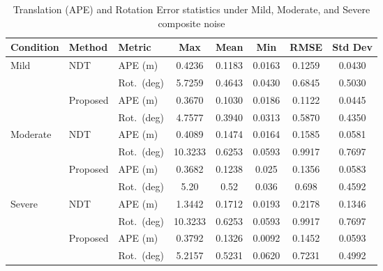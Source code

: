 \begin{table}[H]
	\centering
	\caption{Translation (APE) and Rotation Error statistics under Mild, Moderate, and Severe composite noise}
	\label{tab:ape_noise_all_swapped}
	\begin{tabular}{l l l c c c c c}
		\toprule
		\textbf{Condition} & \textbf{Method} & \textbf{Metric}  & \textbf{Max} & \textbf{Mean} & \textbf{Min} & \textbf{RMSE} & \textbf{Std Dev} \\
		\midrule
		\multirow{4}{*}{Mild}     
		& \multirow{2}{*}{NDT}      
		& APE (m)      & 0.4236 & 0.1183 & 0.0163 & 0.1259 & 0.0430 \\
		&                           
		& Rot.\ (deg)  & 5.7259 & 0.4643 & 0.0430 & 0.6845 & 0.5030 \\
		\cmidrule{2-8}
		& \multirow{2}{*}{Proposed} 
		& APE (m)      & 0.3670 & 0.1030 & 0.0186 & 0.1122 & 0.0445 \\
		&                           
		& Rot.\ (deg)  & 4.7577 & 0.3940 & 0.0313 & 0.5870 & 0.4350 \\
		\midrule
		\multirow{4}{*}{Moderate} 
		& \multirow{2}{*}{NDT}      
		& APE (m)      & 0.4089 & 0.1474 & 0.0164 & 0.1585 & 0.0581 \\
		&                           
		& Rot.\ (deg)  & 10.3233 & 0.6253 & 0.0593 & 0.9917 & 0.7697 \\
		\cmidrule{2-8}
		& \multirow{2}{*}{Proposed} 
		& APE (m)      & 0.3682 & 0.1238 & 0.025 & 0.1356 & 0.0583 \\
		&                           
		& Rot.\ (deg)  & 5.20& 0.52 & 0.036 & 0.698 & 0.4592 \\
		\midrule
		\multirow{4}{*}{Severe}   
		& \multirow{2}{*}{NDT}      
		& APE (m)      & 1.3442 & 0.1712 & 0.0193 & 0.2178 & 0.1346 \\
		&                           
		& Rot.\ (deg)  & 10.3233 & 0.6253 & 0.0593 & 0.9917 & 0.7697 \\
		\cmidrule{2-8}
		& \multirow{2}{*}{Proposed} 
		& APE (m)      & 0.3792 & 0.1326 & 0.0092 & 0.1452 & 0.0593 \\
		&                           
		& Rot.\ (deg)  & 5.2157 & 0.5231 & 0.0620 & 0.7231 & 0.4992 \\
		\bottomrule
	\end{tabular}
\end{table}






